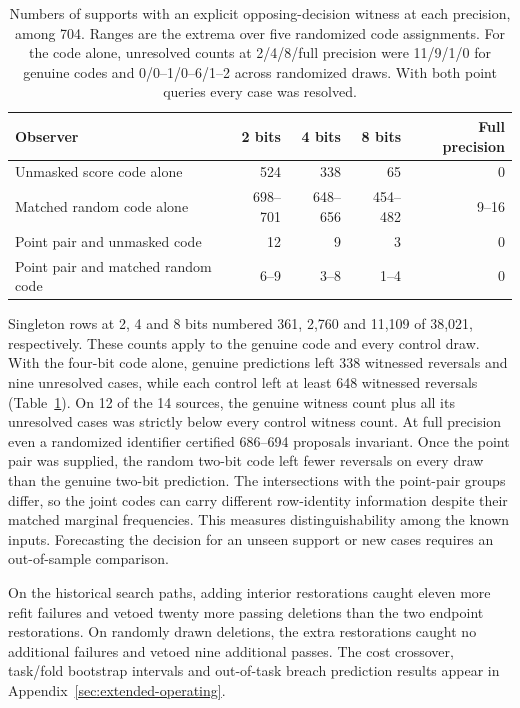 \begin{table}[tb]
\centering\small
\caption{Numbers of supports with an explicit opposing-decision witness at each precision, among 704. Ranges are the extrema over five randomized code assignments. For the code alone, unresolved counts at 2/4/8/full precision were 11/9/1/0 for genuine codes and 0/0--1/0--6/1--2 across randomized draws. With both point queries every case was resolved.}
\label{tab:precision}
\begin{tabular}{@{}lrrrr@{}}
\toprule
Observer & 2 bits & 4 bits & 8 bits & Full precision\\
\midrule
Unmasked score code alone & 524 & 338 & 65 & 0\\
Matched random code alone & 698--701 & 648--656 & 454--482 & 9--16\\
Point pair and unmasked code & 12 & 9 & 3 & 0\\
Point pair and matched random code & 6--9 & 3--8 & 1--4 & 0\\
\bottomrule
\end{tabular}
\end{table}

Singleton rows at 2, 4 and 8 bits numbered 361, 2,760 and 11,109 of 38,021, respectively. These counts apply to the genuine code and every control draw. With the four-bit code alone, genuine predictions left 338 witnessed reversals and nine unresolved cases, while each control left at least 648 witnessed reversals (Table~\ref{tab:precision}). On 12 of the 14 sources, the genuine witness count plus all its unresolved cases was strictly below every control witness count. At full precision even a randomized identifier certified 686--694 proposals invariant. Once the point pair was supplied, the random two-bit code left fewer reversals on every draw than the genuine two-bit prediction. The intersections with the point-pair groups differ, so the joint codes can carry different row-identity information despite their matched marginal frequencies. This measures distinguishability among the known inputs. Forecasting the decision for an unseen support or new cases requires an out-of-sample comparison.



On the historical search paths, adding interior restorations caught eleven more refit failures and vetoed twenty more passing deletions than the two endpoint restorations. On randomly drawn deletions, the extra restorations caught no additional failures and vetoed nine additional passes. The cost crossover, task/fold bootstrap intervals and out-of-task breach prediction results appear in Appendix~\ref{sec:extended-operating}.
